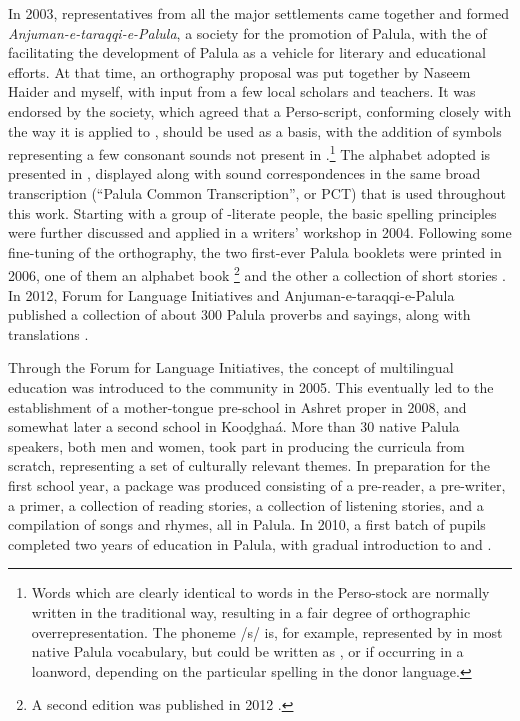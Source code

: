 In 2003, representatives from all the major settlements came together and formed \textit{Anjuman-e-taraqqi-e-Palula}, a society for the promotion of Palula, with the  of facilitating the development of Palula as a vehicle for literary and educational efforts. At that time, an orthography proposal was put together by Naseem Haider and myself, with input from a few local scholars and teachers. It was endorsed by the society, which agreed that a Perso-\iliArabic script, conforming closely with the way it is applied to \iliUrdu, should be used as a basis, with the addition of symbols representing a few consonant sounds not present in \iliUrdu.\footnote{Words which are clearly identical to words in the Perso-\iliArabic stock are normally written in the traditional way, resulting in a fair degree of orthographic overrepresentation. The phoneme /s/ is, for example, represented by {\large{}} in most native Palula vocabulary, but could be written as {\large{}}, {\large{}} or {\large{}} if occurring in a loanword, depending on the particular spelling in the donor language.} The alphabet adopted is presented in , displayed along with sound correspondences in the same broad transcription (``Palula Common Transcription'', or PCT) that is used throughout this work. Starting with a group of \iliUrdu-literate people, the basic spelling principles were further discussed and applied in a writers’ workshop in 2004. Following some fine-tuning of the orthography, the two first-ever Palula booklets were printed in 2006, one of them an alphabet book \citep{haider2006a}\footnote{A second edition was published in 2012 \citep{haider2012a}.} and the other a collection of short stories \citep{haider2006b}. In 2012, Forum for Language Initiatives and Anjuman-e-taraqqi-e-Palula published a collection of about 300 Palula proverbs and sayings, along with \iliUrdu translations \citep{haider2012b}.


Through the Forum for Language Initiatives, the concept of multilingual education was introduced to the community in 2005. This eventually led to the establishment of a mother-tongue pre-school in Ashret proper in 2008, and somewhat later a second school in Kooḍghaá. More than 30 native Palula speakers, both men and women, took part in producing the curricula from scratch, representing a set of culturally relevant themes. In preparation for the first school year, a package was produced consisting of a pre-reader, a pre-writer, a primer, a collection of reading stories, a collection of listening stories, and a compilation of songs and rhymes, all in Palula. In 2010, a first batch of pupils completed two years of education in Palula, with gradual introduction to \iliUrdu and \iliEnglish \citep{rehmansagar2015}. 


